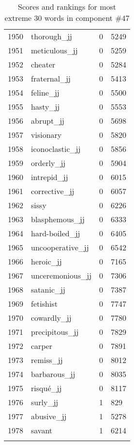 \begin{longtable}[!htbp]{| rlr@{.}l |}
    1950 & thorough\_jj & 0 & 5249 \\
    1951 & meticulous\_jj & 0 & 5259 \\
    1952 & cheater & 0 & 5284 \\
    1953 & fraternal\_jj & 0 & 5413 \\
    1954 & feline\_jj & 0 & 5500 \\
    1955 & hasty\_jj & 0 & 5553 \\
    1956 & abrupt\_jj & 0 & 5698 \\
    1957 & visionary & 0 & 5820 \\
    1958 & iconoclastic\_jj & 0 & 5856 \\
    1959 & orderly\_jj & 0 & 5904 \\
    1960 & intrepid\_jj & 0 & 6015 \\
    1961 & corrective\_jj & 0 & 6057 \\
    1962 & sissy & 0 & 6226 \\
    1963 & blasphemous\_jj & 0 & 6333 \\
    1964 & hard-boiled\_jj & 0 & 6405 \\
    1965 & uncooperative\_jj & 0 & 6542 \\
    1966 & heroic\_jj & 0 & 7165 \\
    1967 & unceremonious\_jj & 0 & 7306 \\
    1968 & satanic\_jj & 0 & 7387 \\
    1969 & fetishist & 0 & 7747 \\
    1970 & cowardly\_jj & 0 & 7780 \\
    1971 & precipitous\_jj & 0 & 7829 \\
    1972 & carper & 0 & 7891 \\
    1973 & remiss\_jj & 0 & 8012 \\
    1974 & barbarous\_jj & 0 & 8035 \\
    1975 & risqué\_jj & 0 & 8117 \\
    1976 & surly\_jj & 1 & 829 \\
    1977 & abusive\_jj & 1 & 5278 \\
    1978 & savant & 1 & 6214 \\
    \hline
    \caption{Scores and rankings for most extreme 30 words in component \#47} \\
\end{longtable}
